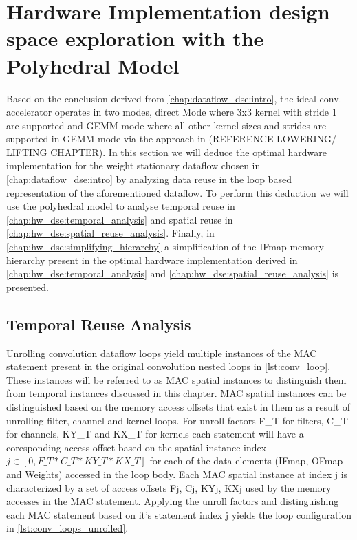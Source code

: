
\chapter{Hardware Implementation design space exploration with the Polyhedral Model}
\label{chap:hw_dse:intro}

Based on the conclusion derived from \autoref{chap:dataflow_dse:intro},
the ideal conv. accelerator operates in two modes, direct Mode where 3x3 kernel
with stride 1 are supported and GEMM mode where all other kernel sizes and
strides are supported in GEMM mode via the approach in (REFERENCE LOWERING/
LIFTING CHAPTER). In this section we will deduce the optimal hardware
implementation for the weight stationary dataflow chosen in
\autoref{chap:dataflow_dse:intro} by analyzing data reuse in the loop based
representation of the aforementioned dataflow. To perform this deduction we will
use the polyhedral model to analyse temporal reuse in
\autoref{chap:hw_dse:temporal_analysis} and spatial reuse in
\autoref{chap:hw_dse:spatial_reuse_analysis}. Finally, in
\autoref{chap:hw_dse:simplifying_hierarchy} a simplification of the IFmap memory
hierarchy present in the optimal hardware implementation derived in
\autoref{chap:hw_dse:temporal_analysis} and
\autoref{chap:hw_dse:spatial_reuse_analysis} is presented.

\section{Temporal Reuse Analysis}
\label{chap:hw_dse:temporal_analysis}

Unrolling convolution dataflow loops yield multiple instances of the \ac{MAC}
statement present in the original convolution nested loops in
\autoref{lst:conv_loop}. These instances will be referred to as \ac{MAC} spatial
instances to distinguish them from temporal instances discussed in this chapter.
\ac{MAC} spatial instances can be distinguished based on the memory access
offsets that exist in them as a result of unrolling filter, channel and kernel
loops. For unroll factors F\_T for filters, C\_T for channels, KY\_T and KX\_T
for kernels each statement will have a coresponding access offset based on the
spatial instance index $j \in [0, F\_T*C\_T*KY\_T*KX\_T]$ for each of the data
elements (IFmap, OFmap and Weights) accessed in the loop body. Each \ac{MAC}
spatial instance at index j is characterized by a set of access offsets {Fj, Cj,
KYj, KXj} used by the memory accesses in the \ac{MAC} statement. Applying the
unroll factors and distinguishing each \ac{MAC} statement based on it's
statement index j yields the loop configuration in
\autoref{lst:conv_loops_unrolled}. 

